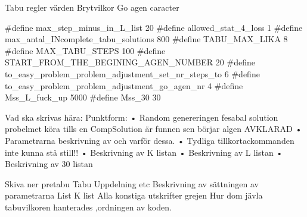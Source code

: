 
Tabu regler värden
Brytvilkor
Go agen caracter

#define max_step_minus_in_L_list 20 				
#define allowed_stat_4_loss 1				
#define max_antal_INcomplete_tabu_solutions 800
#define TABU_MAX_LIKA 8
#define MAX_TABU_STEPS 100	
#define START_FROM_THE_BEGINING_AGEN_NUMBER 20 		
#define to_easy_problem_problem_adjustment_set_nr_steps_to 6		
#define to_easy_problem_problem_adjustment_go_agen_nr 4	
#define Mss_L_fuck_up 5000
#define Mss_30 30

Vad ska skrivas hära:
Punktform:
•	Random genereringen fesabal solution probelmet köra tills en CompSolution är funnen sen börjar algen AVKLARAD
•	Parametrarna beskrivning av och varför dessa. 
•	Tydliga tillkortackommanden inte kunna stå still!!
•	Beskrivning av K listan
•	Beskrivning av L listan
•	Beskrivning av 30 listan





Skiva ner pretabu
Tabu 
Uppdelning etc
Beskrivning av sättningen av parametrarna List K list 
Alla konstiga utskrifter grejen
Hur dom jävla tabuvilkoren hanterades ,ordningen av koden.
